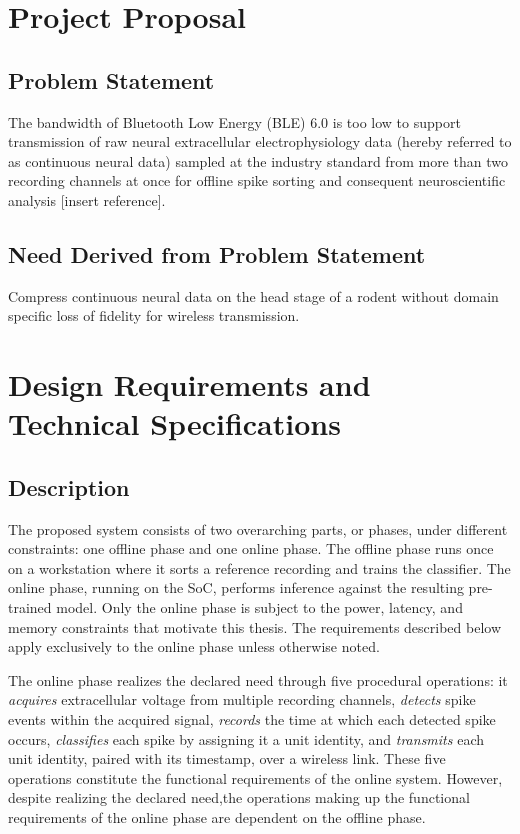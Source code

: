 \documentclass[11pt]{article}
\begin{document}
\section*{Project Proposal}

\subsection*{Problem Statement}
The bandwidth of Bluetooth Low Energy (BLE) 6.0 is too low to support transmission 
of raw neural extracellular electrophysiology data (hereby referred to as continuous neural data) 
sampled at the industry standard from more than two recording channels at once for offline spike 
sorting and consequent neuroscientific analysis [insert reference].

\subsection*{Need Derived from Problem Statement}
Compress continuous neural data on the head stage of a rodent without domain specific 
loss of fidelity for wireless transmission. 

\section*{Design Requirements and Technical Specifications}
\subsection*{Description}

The proposed system consists of two overarching parts, or phases, under different 
constraints: one offline phase and one online phase. The offline phase runs once 
on a workstation where it sorts a reference recording and trains the classifier. The 
online phase, running on the SoC, performs inference against the resulting pre-trained 
model. Only the online phase is subject to the power, latency, and memory constraints that
motivate this thesis. The requirements described below apply exclusively to the
online phase unless otherwise noted.

The online phase realizes the declared need through five procedural operations: it
\emph{acquires} extracellular voltage from multiple recording channels,
\emph{detects} spike events within the acquired signal, \emph{records} the time
at which each detected spike occurs, \emph{classifies} each spike by assigning
it a unit identity, and \emph{transmits} each unit identity, paired with its
timestamp, over a wireless link. These five operations constitute the
functional requirements of the online system. However, despite realizing the declared 
need,the operations making up the functional requirements of the online phase are 
dependent on the offline phase. 
\end{document}
